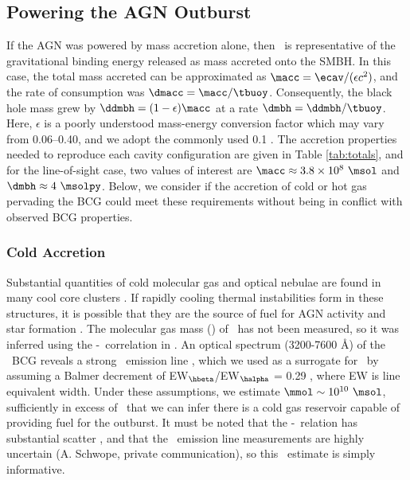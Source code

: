 \documentclass[iop]{emulateapj}
\begin{document}
\subsection{Powering the AGN Outburst}
\label{sec:accretion}

If the AGN was powered by mass accretion alone, then \ecav\ is
representative of the gravitational binding energy released as mass
accreted onto the SMBH. In this case, the total mass accreted can be
approximated as $\macc = \ecav/(\epsilon c^2)$, and the rate of
consumption was $\dmacc = \macc/\tbuoy$. Consequently, the black hole
mass grew by $\ddmbh = (1-\epsilon)\macc$ at a rate $\dmbh =
\ddmbh/\tbuoy$. Here, $\epsilon$ is a poorly understood mass-energy
conversion factor which may vary from 0.06--0.40, and we adopt the
commonly used 0.1 \citep{2002apa..book.....F}. The accretion
properties needed to reproduce each cavity configuration are given in
Table \ref{tab:totals}, and for the line-of-sight case, two values of
interest are $\macc \approx 3.8 \times 10^8 ~\msol$ and $\dmbh
\approx 4 ~\msolpy$. Below, we consider if the accretion of cold or
hot gas pervading the BCG could meet these requirements without being
in conflict with observed BCG properties.

\subsubsection{Cold Accretion}
\label{sec:cold}

Substantial quantities of cold molecular gas and optical nebulae are
found in many cool core clusters \citep{crawford99, edge01}. If
rapidly cooling thermal instabilities form in these structures, it is
possible that they are the source of fuel for AGN activity and star
formation \citep[\eg][]{pizzolato05, 2010arXiv1003.4181P}. The
molecular gas mass (\mmol) of \rbs\ has not been measured, so it was
inferred using the \mmol-\halpha\ correlation in \citet{edge01}. An
optical spectrum (3200-7600 \AA) of the \rbs\ BCG reveals a strong
\hbeta\ emission line \citep{rbs1, rbs2}, which we used as a surrogate
for \halpha\ by assuming a Balmer decrement of
EW$_{\hbeta}$/EW$_{\halpha}$ = 0.29 \citep{2006ApJ...642..775M}, where
EW is line equivalent width. Under these assumptions, we estimate
$\mmol \sim 10^{10} ~\msol$, sufficiently in excess of \macc\ that we
can infer there is a cold gas reservoir capable of providing fuel for
the outburst. It must be noted that the \mmol-\halpha\ relation has
substantial scatter \citep{salome03}, and that the \rbs\ emission line
measurements are highly uncertain (A. Schwope, private communication),
so this \mmol\ estimate is simply informative.
\end{document}

